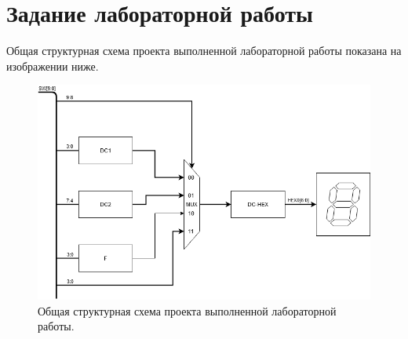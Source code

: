 \section{Задание лабораторной работы}

Общая структурная схема проекта выполненной лабораторной работы показана на изображении ниже.

\begin{figure}[H]
  \centering
  \includegraphics [width=1\textwidth] {images/lab_1/lab1_sch.png}
  \caption{Общая структурная схема проекта выполненной лабораторной работы.}
\end{figure}


